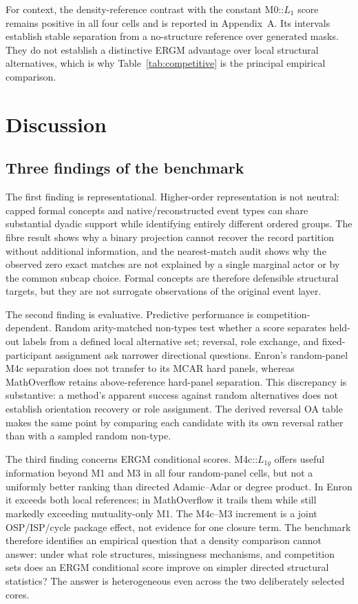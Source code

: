 \documentclass[10pt]{article}
\begin{document}
For context, the density-reference contrast with the constant M0::$L_1$ score remains positive in all four cells and is reported in Appendix~A. Its intervals establish stable separation from a no-structure reference over generated masks. They do not establish a distinctive ERGM advantage over local structural alternatives, which is why Table~\ref{tab:competitive} is the principal empirical comparison.

\section{Discussion}
\subsection{Three findings of the benchmark}
The first finding is representational. Higher-order representation is not neutral: capped formal concepts and native/reconstructed event types can share substantial dyadic support while identifying entirely different ordered groups. The fibre result shows why a binary projection cannot recover the record partition without additional information, and the nearest-match audit shows why the observed zero exact matches are not explained by a single marginal actor or by the common subcap choice. Formal concepts are therefore defensible structural targets, but they are not surrogate observations of the original event layer.

The second finding is evaluative. Predictive performance is competition-dependent. Random arity-matched non-types test whether a score separates held-out labels from a defined local alternative set; reversal, role exchange, and fixed-participant assignment ask narrower directional questions. Enron's random-panel M4c separation does not transfer to its MCAR hard panels, whereas MathOverflow retains above-reference hard-panel separation. This discrepancy is substantive: a method's apparent success against random alternatives does not establish orientation recovery or role assignment. The derived reversal OA table makes the same point by comparing each candidate with its own reversal rather than with a sampled random non-type.

The third finding concerns ERGM conditional scores. M4c::$L_{1g}$ offers useful information beyond M1 and M3 in all four random-panel cells, but not a uniformly better ranking than directed Adamic--Adar or degree product. In Enron it exceeds both local references; in MathOverflow it trails them while still markedly exceeding mutuality-only M1. The M4c--M3 increment is a joint OSP/ISP/cycle package effect, not evidence for one closure term. The benchmark therefore identifies an empirical question that a density comparison cannot answer: under what role structures, missingness mechanisms, and competition sets does an ERGM conditional score improve on simpler directed structural statistics? The answer is heterogeneous even across the two deliberately selected cores.
\end{document}
